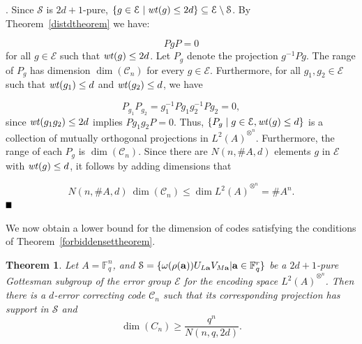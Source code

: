 \documentclass{Rinton-P9x6}
\newtheorem{theorem}{Theorem}[section]
\newcommand{\F}{\ensuremath{\mathbb{F}}}
\newcommand{\GF}[2][]{{\ensuremath{\mathbb{F}_{#2}^{#1}}}}
\newcommand{\bproof}{\noindent{\it Proof}}
\newcommand{\eproof}{\hspace*{\fill}$\rule{2mm}{2mm}$~~~~~\bigskip}
\renewenvironment{proof}{\bproof. }{\eproof}
\renewcommand{\a}{{\bf a}}
\newcommand{\wt}{{\it wt}}
\newcommand{\C}{{\ensuremath{\mathcal{C}}}}
\renewcommand{\S}{{\ensuremath{\mathcal{S}}}}
\newcommand{\HinA}{{\ensuremath{{L^2(A)}^{\otimes^n}}}}
\newcommand{\E}{{\ensuremath{\mathcal{E}}}}
\begin{document}
\begin{proof}
  Since $\S$ is $2d+1$-pure, $\{g\in\E\mid \wt(g)\leq 2d\}\subseteq
  \E\setminus\S$. By Theorem~\ref{distdtheorem} we have:

\[ 
PgP = 0
\] 
for all $g\in\E$ such that $\wt(g)\leq 2d$. Let $P_g$ denote the
projection $g^{-1}Pg$. The range of $P_g$ has dimension $\dim(\C_n)$
for every $g\in\E$. Furthermore, for all $g_1, g_2\in\E$ such that
$\wt(g_1)\leq d$ and $\wt(g_2)\leq d$, we have 

\[ 
P_{g_1} P_{g_2} = g_1^{-1} P g_1 g_2^{-1} P g_2 = 0,
\] 
since $\wt(g_1 g_2)\leq 2d$ implies $P g_1 g_2 P = 0$. Thus,
$\{P_g\mid g\in\E, \wt(g)\leq d\}$ is a collection of mutually
orthogonal projections in $\HinA$. Furthermore, the range of each
$P_g$ is $\dim(\C_n)$. Since there are $N(n,\#A,d)$ elements $g$ in
$\E$ with $\wt(g)\leq d$, it follows by adding dimensions that

\[
N\left(n,\#A,d\right)~\dim(\C_n) \leq \dim{\HinA} = \#A^n.
\] 
\end{proof}

We now obtain a lower bound for the dimension of codes satisfying
the conditions of Theorem~\ref{forbiddensettheorem}.

\begin{theorem}\label{lowerbound}
  Let $A=\F^n_q$, and $\S=\{ \omega(\rho(\a)) U_{L \a} V_{M \a} | \a
  \in \GF[r]{q}\}$ be a $2d+1$-pure Gottesman subgroup of the error
  group $\E$ for the encoding space $\HinA$. Then there is a $d$-error
  correcting code $\C_n$ such that its corresponding projection has
  support in $\S$ and
\[
\dim(C_n)\geq \frac{q^n}{N(n,q,2d)}.
\]
\end{theorem}
\end{document}
